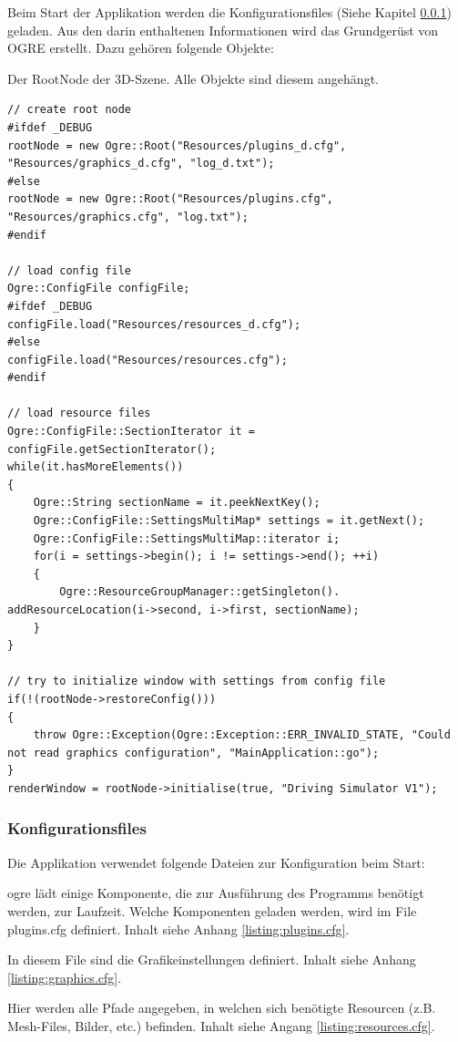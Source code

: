Beim Start der Applikation werden die Konfigurationsfiles (Siehe Kapitel \ref{sec:konfigurationsfiles}) geladen. Aus den darin enthaltenen Informationen wird das Grundgerüst von OGRE erstellt. Dazu gehören folgende Objekte:

Der RootNode der 3D-Szene. Alle Objekte sind diesem angehängt.

\begin{lstlisting}[caption={Laden der Konfigurationsdateien},label={laden_konfigurationsdateien}]
// create root node
#ifdef _DEBUG
rootNode = new Ogre::Root("Resources/plugins_d.cfg", "Resources/graphics_d.cfg", "log_d.txt");
#else
rootNode = new Ogre::Root("Resources/plugins.cfg", "Resources/graphics.cfg", "log.txt");
#endif

// load config file
Ogre::ConfigFile configFile;
#ifdef _DEBUG
configFile.load("Resources/resources_d.cfg");
#else
configFile.load("Resources/resources.cfg");
#endif

// load resource files
Ogre::ConfigFile::SectionIterator it = configFile.getSectionIterator();
while(it.hasMoreElements())
{
	Ogre::String sectionName = it.peekNextKey();
	Ogre::ConfigFile::SettingsMultiMap* settings = it.getNext();
	Ogre::ConfigFile::SettingsMultiMap::iterator i;
	for(i = settings->begin(); i != settings->end(); ++i)
	{
		Ogre::ResourceGroupManager::getSingleton(). addResourceLocation(i->second, i->first, sectionName);
	}
}

// try to initialize window with settings from config file
if(!(rootNode->restoreConfig()))
{
	throw Ogre::Exception(Ogre::Exception::ERR_INVALID_STATE, "Could not read graphics configuration", "MainApplication::go");
}
renderWindow = rootNode->initialise(true, "Driving Simulator V1");
\end{lstlisting}

\subsubsection{Konfigurationsfiles}
\label{sec:konfigurationsfiles}

Die Applikation verwendet folgende Dateien zur Konfiguration beim Start:

\gls{ogre} lädt einige Komponente, die zur Ausführung des Programms benötigt werden, zur Laufzeit. Welche Komponenten geladen werden, wird im File plugins.cfg definiert. Inhalt siehe Anhang \ref{listing:plugins.cfg}.

In diesem File sind die Grafikeinstellungen definiert. Inhalt siehe Anhang \ref{listing:graphics.cfg}.

Hier werden alle Pfade angegeben, in welchen sich benötigte Resourcen (z.B. Mesh-Files, Bilder, etc.) befinden. Inhalt siehe Angang \ref{listing:resources.cfg}.





